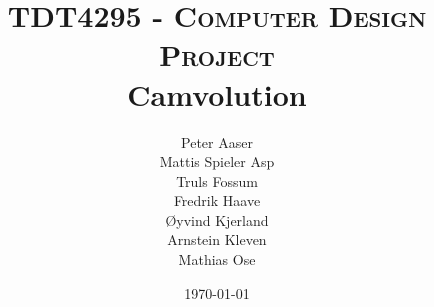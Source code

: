 
\title{
    \textsc{\Large TDT4295 - Computer Design Project}\\[0.5cm]
    {\huge \bfseries Camvolution}
}

\posttitle{
    ~\\[0.4cm]
    \HRule \\[0.4cm]
}

\author{
    Peter Aaser\\
    Mattis Spieler Asp\\
    Truls Fossum\\
    Fredrik Haave\\
    Øyvind Kjerland\\
    Arnstein Kleven\\
    Mathias Ose
}

\predate{
    \vspace{\fill}
    \begin{center}
    \large
}

\date{\today}

\postdate{
    \par
    \end{center}
}

\maketitle

